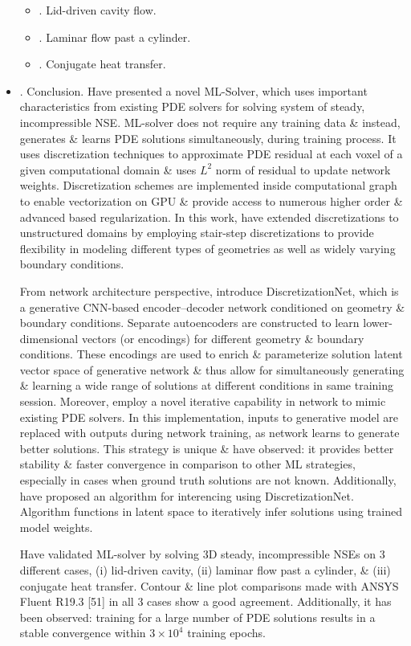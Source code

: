 \documentclass{article}
\begin{document}
\begin{itemize}
	\begin{itemize}
		\item {. Lid-driven cavity flow.}
		\item {. Laminar flow past a cylinder.}
		\item {. Conjugate heat transfer.}
	\end{itemize}
	\item {. Conclusion.} Have presented a novel ML-Solver, which uses important characteristics from existing PDE solvers for solving system of steady, incompressible NSE. ML-solver does not require any training data \& instead, generates \& learns PDE solutions simultaneously, during training process. It uses discretization techniques to approximate PDE residual at each voxel of a given computational domain \& uses $L^2$ norm of residual to update network weights. Discretization schemes are implemented inside computational graph to enable vectorization on GPU \& provide access to numerous higher order \& advanced based regularization. In this work, have extended discretizations to unstructured domains by employing stair-step discretizations to provide flexibility in modeling different types of geometries as well as widely varying boundary conditions.
	
	From network architecture perspective, introduce DiscretizationNet, which is a generative CNN-based encoder--decoder network conditioned on geometry \& boundary conditions. Separate autoencoders are constructed to learn lower-dimensional vectors (or encodings) for different geometry \& boundary conditions. These encodings are used to enrich \& parameterize solution latent vector space of generative network \& thus allow for simultaneously generating \& learning a wide range of solutions at different conditions in same training session. Moreover, employ a novel iterative capability in network to mimic existing PDE solvers. In this implementation, inputs to generative model are replaced with outputs during network training, as network learns to generate better solutions. This strategy is unique \& have observed: it provides better stability \& faster convergence in comparison to other ML strategies, especially in cases when ground truth solutions are not known. Additionally, have proposed an algorithm for interencing using DiscretizationNet. Algorithm functions in latent space to iteratively infer solutions using trained model weights.
	
	Have validated ML-solver by solving 3D steady, incompressible NSEs on 3 different cases, (i) lid-driven cavity, (ii) laminar flow past a cylinder, \& (iii) conjugate heat transfer. Contour \& line plot comparisons made with ANSYS Fluent R19.3 [51] in all 3 cases show a good agreement. Additionally, it has been observed: training for a large number of PDE solutions results in a stable convergence within $3\times10^4$ training epochs.
	

\end{itemize}
\end{document}
